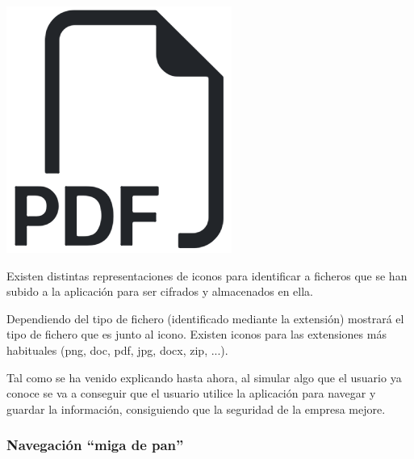 \documentclass{\ClassPath/viu-tfm-template}
\begin{document}
{
    \begin{minipage}{0.1\linewidth}
        \includegraphics[width=\linewidth]{img/file.png}
    \end{minipage}
    \hfill
    \begin{minipage}{0.85\linewidth}
        Existen distintas representaciones de iconos para identificar a ficheros que se han subido a la aplicación para ser cifrados y almacenados en ella.

        Dependiendo del tipo de fichero (identificado mediante la extensión) mostrará el tipo de fichero que es junto al icono. Existen iconos para las extensiones más habituales (png, doc, pdf, jpg, docx, zip, ...).
    \end{minipage}
}

Tal como se ha venido explicando hasta ahora, al simular algo que el usuario ya conoce se va a conseguir que el usuario utilice la aplicación para navegar y guardar la información, consiguiendo que la seguridad de la empresa mejore.


\subsubsection*{Navegación “miga de pan”}
\end{document}
